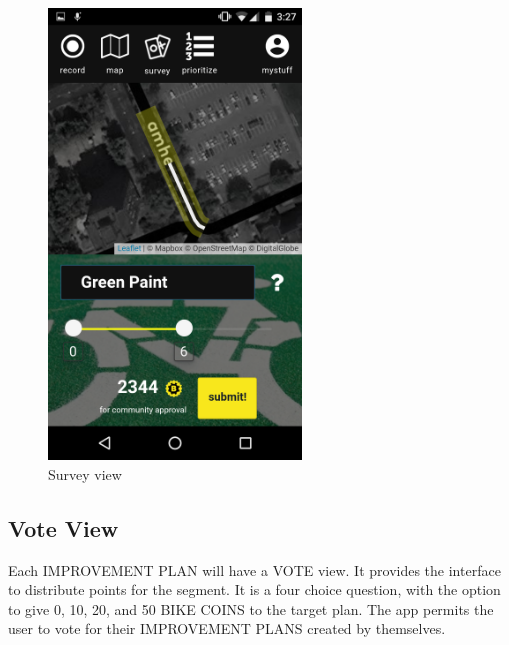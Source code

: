 \begin{figure}[!htb]
  \includegraphics[width=0.6\textwidth]{chapters/4/fig/interface_solution2.png}               
  \caption[interface: Survey]{Survey view}
  \label{fig:interface_improvment}
\end{figure}

\subsection{Vote View}

Each IMPROVEMENT PLAN will have a VOTE view. It provides the interface to
distribute points for the segment. It is a four choice question, with the
option to give 0, 10, 20, and 50 BIKE COINS to the target plan. The app
permits the user to vote for their IMPROVEMENT PLANS created by themselves.


